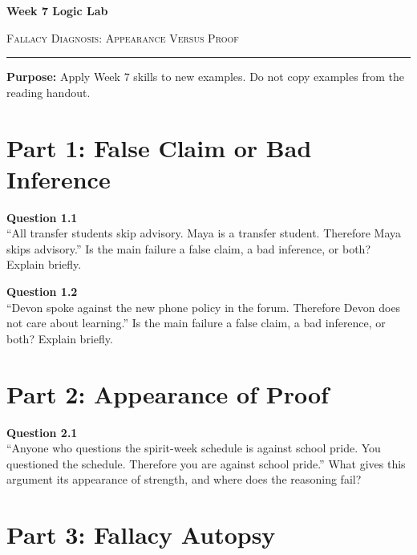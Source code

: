 \documentclass[12pt]{article}
\begin{document}
\begin{center}
{\LARGE\bfseries Week 7 Logic Lab}\par\vspace{0.05em}
{\large\scshape Fallacy Diagnosis: Appearance Versus Proof}\par\vspace{0.1em}
\rule{0.78\textwidth}{0.5pt}\par\vspace{0.15em}
\end{center}

\noindent\textbf{Purpose:} Apply Week 7 skills to new examples. Do not copy examples from the reading handout.

\vspace{0.3em}

\section*{Part 1: False Claim or Bad Inference}

\textbf{Question 1.1}\\[-0.15em]
``All transfer students skip advisory. Maya is a transfer student. Therefore Maya skips advisory.'' Is the main failure a false claim, a bad inference, or both? Explain briefly.


\textbf{Question 1.2}\\[-0.15em]
``Devon spoke against the new phone policy in the forum. Therefore Devon does not care about learning.'' Is the main failure a false claim, a bad inference, or both? Explain briefly.


\newpage

\section*{Part 2: Appearance of Proof}

\textbf{Question 2.1}\\[-0.15em]
``Anyone who questions the spirit-week schedule is against school pride. You questioned the schedule. Therefore you are against school pride.'' What gives this argument its appearance of strength, and where does the reasoning fail?


\newpage

\section*{Part 3: Fallacy Autopsy}
\end{document}
